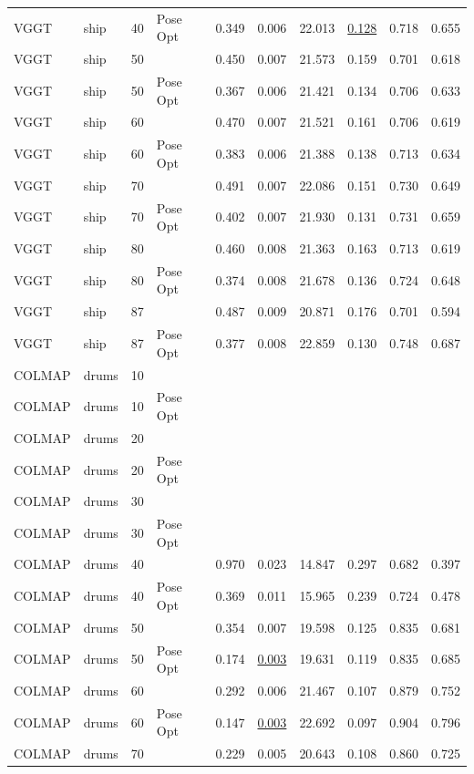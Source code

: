 \begin{table}[H]
\begin{tabular}{llrlrrrrrr}
VGGT & ship & 40 & Pose Opt & 0.349 & 0.006 & 22.013 & \underline{0.128} & 0.718 & 0.655 \\
VGGT & ship & 50 &  & 0.450 & 0.007 & 21.573 & 0.159 & 0.701 & 0.618 \\
VGGT & ship & 50 & Pose Opt & 0.367 & 0.006 & 21.421 & 0.134 & 0.706 & 0.633 \\
VGGT & ship & 60 &  & 0.470 & 0.007 & 21.521 & 0.161 & 0.706 & 0.619 \\
VGGT & ship & 60 & Pose Opt & 0.383 & 0.006 & 21.388 & 0.138 & 0.713 & 0.634 \\
VGGT & ship & 70 &  & 0.491 & 0.007 & 22.086 & 0.151 & 0.730 & 0.649 \\
VGGT & ship & 70 & Pose Opt & 0.402 & 0.007 & 21.930 & 0.131 & 0.731 & 0.659 \\
VGGT & ship & 80 &  & 0.460 & 0.008 & 21.363 & 0.163 & 0.713 & 0.619 \\
VGGT & ship & 80 & Pose Opt & 0.374 & 0.008 & 21.678 & 0.136 & 0.724 & 0.648 \\
VGGT & ship & 87 &  & 0.487 & 0.009 & 20.871 & 0.176 & 0.701 & 0.594 \\
VGGT & ship & 87 & Pose Opt & 0.377 & 0.008 & 22.859 & 0.130 & 0.748 & 0.687 \\
\midrule
COLMAP & drums & 10 &  &  &  &  &  &  &  \\
COLMAP & drums & 10 & Pose Opt &  &  &  &  &  &  \\
COLMAP & drums & 20 &  &  &  &  &  &  &  \\
COLMAP & drums & 20 & Pose Opt &  &  &  &  &  &  \\
COLMAP & drums & 30 &  &  &  &  &  &  &  \\
COLMAP & drums & 30 & Pose Opt &  &  &  &  &  &  \\
COLMAP & drums & 40 &  & 0.970 & 0.023 & 14.847 & 0.297 & 0.682 & 0.397 \\
COLMAP & drums & 40 & Pose Opt & 0.369 & 0.011 & 15.965 & 0.239 & 0.724 & 0.478 \\
COLMAP & drums & 50 &  & 0.354 & 0.007 & 19.598 & 0.125 & 0.835 & 0.681 \\
COLMAP & drums & 50 & Pose Opt & 0.174 & \underline{0.003} & 19.631 & 0.119 & 0.835 & 0.685 \\
COLMAP & drums & 60 &  & 0.292 & 0.006 & 21.467 & 0.107 & 0.879 & 0.752 \\
COLMAP & drums & 60 & Pose Opt & 0.147 & \underline{0.003} & 22.692 & 0.097 & 0.904 & 0.796 \\
COLMAP & drums & 70 &  & 0.229 & 0.005 & 20.643 & 0.108 & 0.860 & 0.725 \\

\end{tabular}
\end{table}
